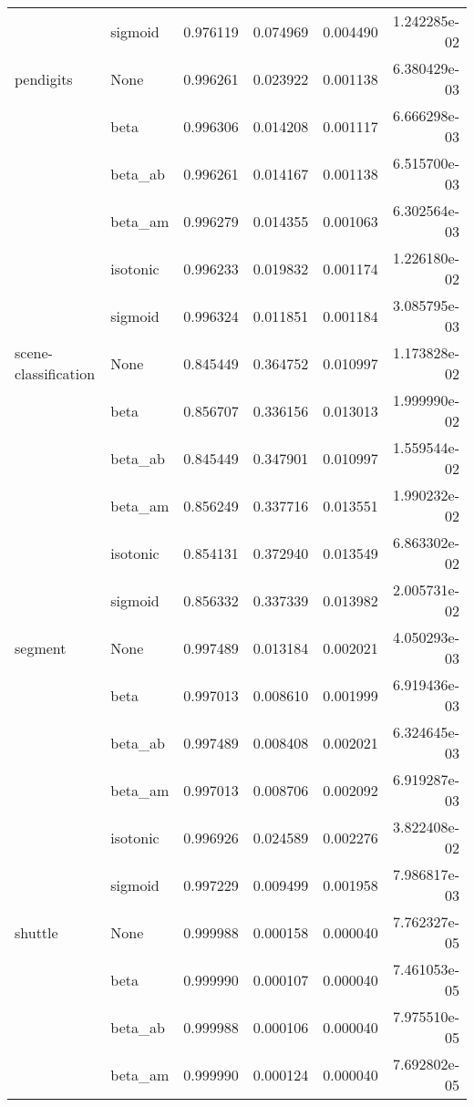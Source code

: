 \begin{tabular}{llrrrr}
        & sigmoid &  0.976119 &  0.074969 &  0.004490 &  1.242285e-02 \\
pendigits & None &  0.996261 &  0.023922 &  0.001138 &  6.380429e-03 \\
        & beta &  0.996306 &  0.014208 &  0.001117 &  6.666298e-03 \\
        & beta\_ab &  0.996261 &  0.014167 &  0.001138 &  6.515700e-03 \\
        & beta\_am &  0.996279 &  0.014355 &  0.001063 &  6.302564e-03 \\
        & isotonic &  0.996233 &  0.019832 &  0.001174 &  1.226180e-02 \\
        & sigmoid &  0.996324 &  0.011851 &  0.001184 &  3.085795e-03 \\
scene-classification & None &  0.845449 &  0.364752 &  0.010997 &  1.173828e-02 \\
        & beta &  0.856707 &  0.336156 &  0.013013 &  1.999990e-02 \\
        & beta\_ab &  0.845449 &  0.347901 &  0.010997 &  1.559544e-02 \\
        & beta\_am &  0.856249 &  0.337716 &  0.013551 &  1.990232e-02 \\
        & isotonic &  0.854131 &  0.372940 &  0.013549 &  6.863302e-02 \\
        & sigmoid &  0.856332 &  0.337339 &  0.013982 &  2.005731e-02 \\
segment & None &  0.997489 &  0.013184 &  0.002021 &  4.050293e-03 \\
        & beta &  0.997013 &  0.008610 &  0.001999 &  6.919436e-03 \\
        & beta\_ab &  0.997489 &  0.008408 &  0.002021 &  6.324645e-03 \\
        & beta\_am &  0.997013 &  0.008706 &  0.002092 &  6.919287e-03 \\
        & isotonic &  0.996926 &  0.024589 &  0.002276 &  3.822408e-02 \\
        & sigmoid &  0.997229 &  0.009499 &  0.001958 &  7.986817e-03 \\
shuttle & None &  0.999988 &  0.000158 &  0.000040 &  7.762327e-05 \\
        & beta &  0.999990 &  0.000107 &  0.000040 &  7.461053e-05 \\
        & beta\_ab &  0.999988 &  0.000106 &  0.000040 &  7.975510e-05 \\
        & beta\_am &  0.999990 &  0.000124 &  0.000040 &  7.692802e-05 \\

\end{tabular}
